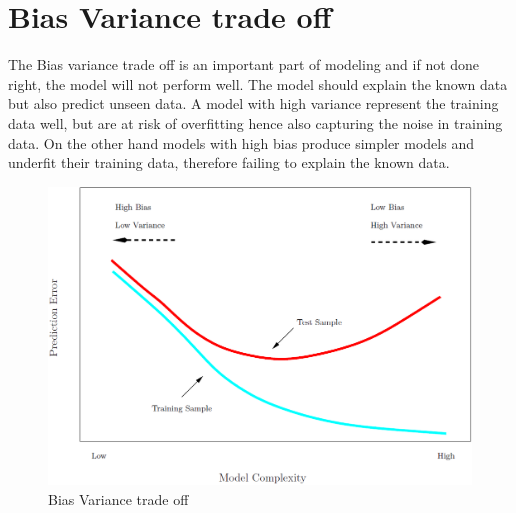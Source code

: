 \section {Bias Variance trade off}
The Bias variance trade off is an important part of modeling and if not done right, the model will not perform well. The model should explain the known data but also predict unseen data. A model with high variance represent the training data well, but are at risk of overfitting hence also capturing the noise in training data. On the other hand models with high bias produce simpler models and underfit their training data, therefore failing to explain the known data.

\begin{figure}[h]
	\centering
	\includegraphics[width=0.5\linewidth]{crossValidation/biasVariance}
	\caption{Bias Variance trade off}
	\label{fig:biasvariance}
\end{figure}
